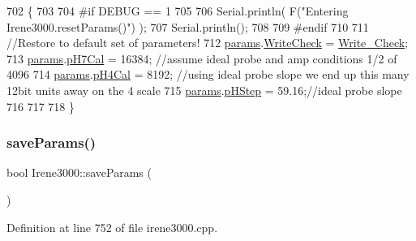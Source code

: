 \begin{DoxyCode}
702 \{
703 
704 \textcolor{preprocessor}{#if DEBUG == 1 }
705 
706     Serial.println( F(\textcolor{stringliteral}{"Entering Irene3000.resetParams()"}) );
707     Serial.println();
708 
709 \textcolor{preprocessor}{#endif }
710 
711     \textcolor{comment}{//Restore to default set of parameters!}
712     \hyperlink{class_irene3000_a136585a5ee7f9ac6ab52175fa153f8e3}{params}.\hyperlink{struct_irene3000_1_1parameters___t_a56f1f14d33a69300d580eda2dc52cecd}{WriteCheck} = \hyperlink{_irene3000_8h_a9fa3b8fd890fde289060ee254cd273d5}{Write\_Check};
713     \hyperlink{class_irene3000_a136585a5ee7f9ac6ab52175fa153f8e3}{params}.\hyperlink{struct_irene3000_1_1parameters___t_a21265466a570d84bff914f26d2f7a03e}{pH7Cal} = 16384; \textcolor{comment}{//assume ideal probe and amp conditions 1/2 of 4096}
714     \hyperlink{class_irene3000_a136585a5ee7f9ac6ab52175fa153f8e3}{params}.\hyperlink{struct_irene3000_1_1parameters___t_a1144de6fb54eb3e1dd2a3d8c2afc97dc}{pH4Cal} = 8192; \textcolor{comment}{//using ideal probe slope we end up this many 12bit units away on the
       4 scale}
715     \hyperlink{class_irene3000_a136585a5ee7f9ac6ab52175fa153f8e3}{params}.\hyperlink{struct_irene3000_1_1parameters___t_a61cfcc2539d5f630e9071f3753aba9fe}{pHStep} = 59.16;\textcolor{comment}{//ideal probe slope}
716 
717 
718 \}
\end{DoxyCode}
\mbox{\label{class_irene3000_a63dbd38e79b8cd5f1fba4b245501a894}} 
\subsubsection{\texorpdfstring{save\+Params()}{saveParams()}}
{\footnotesize\ttfamily bool Irene3000\+::save\+Params (\begin{DoxyParamCaption}{ }\end{DoxyParamCaption})}



Definition at line 752 of file irene3000.\+cpp.



